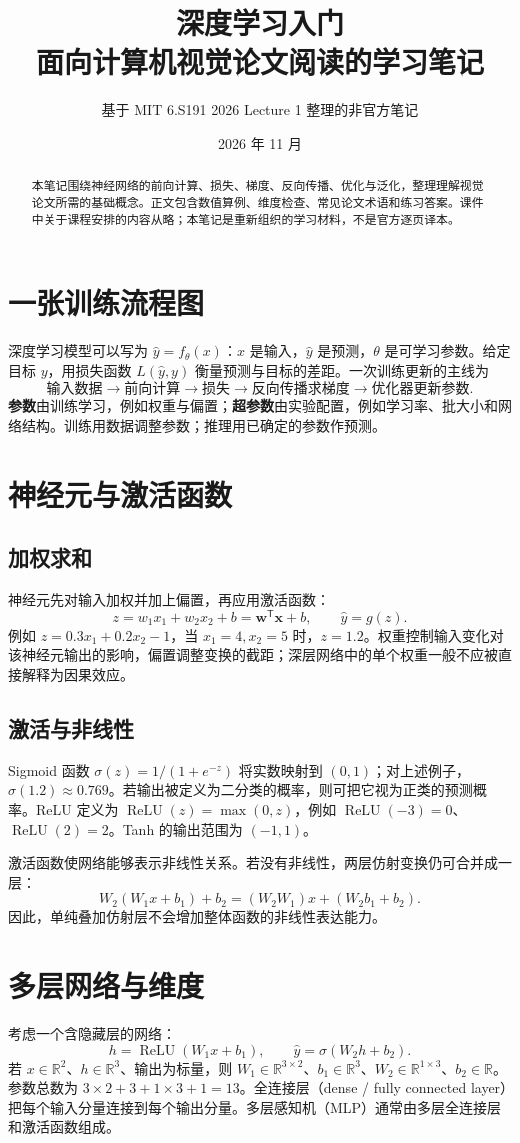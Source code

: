 \documentclass[11pt,a4paper,fontset=none]{ctexart}
\title{\vspace{-1.4cm}\textbf{深度学习入门}\\\large 面向计算机视觉论文阅读的学习笔记}
\author{基于 MIT 6.S191 2026 Lecture 1 整理的非官方笔记}
\date{2026 年 11 月}
\newcommand{\R}{\mathbb{R}}
\begin{document}
\maketitle
\begin{abstract}
本笔记围绕神经网络的前向计算、损失、梯度、反向传播、优化与泛化，整理理解视觉论文所需的基础概念。正文包含数值算例、维度检查、常见论文术语和练习答案。课件中关于课程安排的内容从略；本笔记是重新组织的学习材料，不是官方逐页译本。
\end{abstract}
\tableofcontents
\section{一张训练流程图}
深度学习模型可以写为 $\hat y=f_{\theta}(x)$：$x$ 是输入，$\hat y$ 是预测，$\theta$ 是可学习参数。给定目标 $y$，用损失函数 $L(\hat y,y)$ 衡量预测与目标的差距。一次训练更新的主线为
\[
\text{输入数据}\rightarrow\text{前向计算}\rightarrow\text{损失}\rightarrow\text{反向传播求梯度}\rightarrow\text{优化器更新参数}.
\]
\textbf{参数}由训练学习，例如权重与偏置；\textbf{超参数}由实验配置，例如学习率、批大小和网络结构。训练用数据调整参数；推理用已确定的参数作预测。
\section{神经元与激活函数}
\subsection{加权求和}
神经元先对输入加权并加上偏置，再应用激活函数：
\[
z=w_1x_1+w_2x_2+b=\mathbf w^{\mathsf T}\mathbf x+b,\qquad \hat y=g(z).
\]
例如 $z=0.3x_1+0.2x_2-1$，当 $x_1=4,x_2=5$ 时，$z=1.2$。权重控制输入变化对该神经元输出的影响，偏置调整变换的截距；深层网络中的单个权重一般不应被直接解释为因果效应。
\subsection{激活与非线性}
Sigmoid 函数 $\sigma(z)=1/(1+e^{-z})$ 将实数映射到 $(0,1)$；对上述例子，$\sigma(1.2)\approx0.769$。若输出被定义为二分类的概率，则可把它视为正类的预测概率。ReLU 定义为 $\operatorname{ReLU}(z)=\max(0,z)$，例如 $\operatorname{ReLU}(-3)=0$、$\operatorname{ReLU}(2)=2$。Tanh 的输出范围为 $(-1,1)$。

激活函数使网络能够表示非线性关系。若没有非线性，两层仿射变换仍可合并成一层：
\[
W_2(W_1x+b_1)+b_2=(W_2W_1)x+(W_2b_1+b_2).
\]
因此，单纯叠加仿射层不会增加整体函数的非线性表达能力。
\section{多层网络与维度}
考虑一个含隐藏层的网络：
\[
h=\operatorname{ReLU}(W_1x+b_1),\qquad \hat y=\sigma(W_2h+b_2).
\]
若 $x\in\R^2$、$h\in\R^3$、输出为标量，则 $W_1\in\R^{3\times2}$、$b_1\in\R^3$、$W_2\in\R^{1\times3}$、$b_2\in\R$。参数总数为 $3\times2+3+1\times3+1=13$。全连接层（dense / fully connected layer）把每个输入分量连接到每个输出分量。多层感知机（MLP）通常由多层全连接层和激活函数组成。
\end{document}
